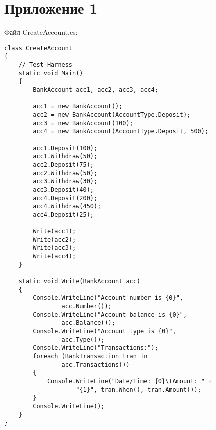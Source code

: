 \chapter*{Приложение 1}

Файл CreateAccount.cs:
\begingroup
\fontsize{12pt}{12pt}\selectfont
\linespread{1.5}
\begin{verbatim}
class CreateAccount
{
    // Test Harness
    static void Main() 
    {
		BankAccount acc1, acc2, acc3, acc4;

		acc1 = new BankAccount();
		acc2 = new BankAccount(AccountType.Deposit);
		acc3 = new BankAccount(100);
		acc4 = new BankAccount(AccountType.Deposit, 500);

		acc1.Deposit(100);
		acc1.Withdraw(50);
		acc2.Deposit(75);
		acc2.Withdraw(50);
        acc3.Withdraw(30);
		acc3.Deposit(40);
		acc4.Deposit(200);
		acc4.Withdraw(450);
		acc4.Deposit(25);

		Write(acc1);
		Write(acc2);
		Write(acc3);
		Write(acc4);
    }
      
    static void Write(BankAccount acc)
    {
        Console.WriteLine("Account number is {0}",
                acc.Number());
        Console.WriteLine("Account balance is {0}", 
                acc.Balance());
        Console.WriteLine("Account type is {0}",
                acc.Type());
		Console.WriteLine("Transactions:");
		foreach (BankTransaction tran in 
                acc.Transactions()) 
		{
			Console.WriteLine("Date/Time: {0}\tAmount: " +
                    "{1}", tran.When(), tran.Amount());
		}
		Console.WriteLine();
    }
}
\end{verbatim}  
\endgroup

